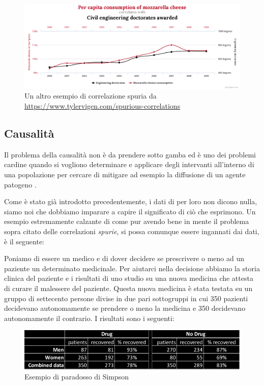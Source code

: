 \begin{figure}[h]
    \begin{center}
        \includegraphics[width=\linewidth]{img/chart1.png}
        \caption{Un altro esempio di correlazione spuria da 
        \url{https://www.tylervigen.com/spurious-correlations}}
        \label{fig:another_spurious_relations}
    \end{center}
\end{figure}

\newpage

\subsection{Causalità}
Il problema della causalità non è da prendere sotto gamba
ed è uno dei problemi cardine quando si vogliono determinare e 
applicare degli intervanti all'interno di una popolazione per
cercare di mitigare ad esempio la diffusione di un agente 
patogeno \cite{Parascandola2001-kw}. 

Come è stato già introdotto precedentemente, i dati di per loro
non dicono nulla, siamo noi che dobbiamo imparare a 
capire il significato di ciò che esprimono. Un esempio 
estremamente calzante di come pur avendo bene in mente il
problema sopra citato delle correlazioni \emph{spurie}, si
possa comunque essere ingannati dai dati, è il seguente:

Poniamo di essere un medico e di dover decidere se 
prescrivere o meno ad un paziente un determinato medicinale.
Per aiutarci nella decisione abbiamo la storia clinica
del paziente e i risultati di uno studio su una nuova 
medicina che attesta di curare il malessere del paziente.
Questa nuova medicina è stata testata su un gruppo di 
settecento persone divise in due pari sottogruppi in cui 
350 pazienti decidevano autonomamente se prendere o meno 
la medicina e 350 decidevano autonomamente il contrario.
I risultati sono i seguenti:

\begin{figure}[h]
    \begin{center}
        \includegraphics[width=\linewidth]{img/simpson.png}
        \caption{Esempio di paradosso di Simpson}
        \label{fig:simpson_paradox}
    \end{center}
\end{figure}

